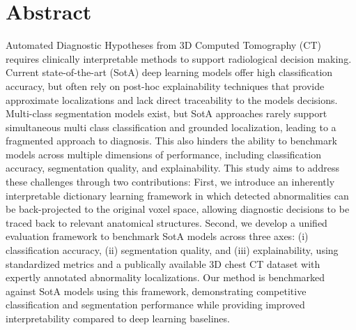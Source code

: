 ﻿
\chapter*{Abstract}
Automated Diagnostic Hypotheses from 3D Computed Tomography (CT) requires clinically interpretable methods to support
radiological decision making.
Current state-of-the-art (SotA) deep learning models offer high classification accuracy, but
often rely on post-hoc explainability techniques that provide approximate
localizations and lack direct traceability to the models decisions.
Multi-class segmentation models exist, but SotA approaches rarely support simultaneous multi class classification and grounded localization,
leading to a fragmented approach to diagnosis.
This also hinders the ability to benchmark models across multiple dimensions of performance, including classification accuracy,
segmentation quality, and explainability.
This study aims to address these challenges through two contributions:
First, we introduce an inherently interpretable dictionary learning framework in which detected abnormalities can be
back-projected to the original voxel space, allowing diagnostic decisions to be traced back to relevant anatomical structures.
Second, we develop a unified evaluation framework to benchmark SotA models across three axes: (i) classification accuracy,
(ii) segmentation quality, and (iii) explainability, using standardized metrics and a publically available 3D chest CT dataset
with expertly annotated abnormality localizations.
Our method is benchmarked against SotA models using this framework, demonstrating competitive
classification and segmentation performance while providing improved interpretability compared to deep learning baselines.
